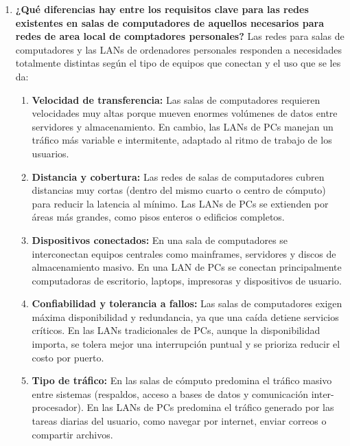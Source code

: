 \documentclass[11pt,a4paper]{article}
\begin{document}
\begin{enumerate}[label=15.\arabic*), itemsep=0.3cm]

  \item \textbf{¿Qué diferencias hay entre los requisitos clave para las redes existentes en salas de computadores de aquellos necesarios para redes de area local de comptadores personales?}
    Las redes para salas de computadores y las LANs de ordenadores personales responden a necesidades totalmente distintas según el tipo de equipos que conectan y el uso que se les da:

    \begin{enumerate}
      \item \textbf{Velocidad de transferencia:}
      Las salas de computadores requieren velocidades muy altas porque mueven enormes volúmenes de datos entre servidores y almacenamiento. En cambio, las LANs de PCs manejan un tráfico más variable e intermitente, adaptado al ritmo de trabajo de los usuarios.

      \item \textbf{Distancia y cobertura:}
      Las redes de salas de computadores cubren distancias muy cortas (dentro del mismo cuarto o centro de cómputo) para reducir la latencia al mínimo. Las LANs de PCs se extienden por áreas más grandes, como pisos enteros o edificios completos.

      \item \textbf{Dispositivos conectados:}
      En una sala de computadores se interconectan equipos centrales como mainframes, servidores y discos de almacenamiento masivo. En una LAN de PCs se conectan principalmente computadoras de escritorio, laptops, impresoras y dispositivos de usuario.

      \item \textbf{Confiabilidad y tolerancia a fallos:}
      Las salas de computadores exigen máxima disponibilidad y redundancia, ya que una caída detiene servicios críticos. En las LANs tradicionales de PCs, aunque la disponibilidad importa, se tolera mejor una interrupción puntual y se prioriza reducir el costo por puerto.

      \item \textbf{Tipo de tráfico:}
      En las salas de cómputo predomina el tráfico masivo entre sistemas (respaldos, acceso a bases de datos y comunicación inter-procesador). En las LANs de PCs predomina el tráfico generado por las tareas diarias del usuario, como navegar por internet, enviar correos o compartir archivos.
    \end{enumerate}


\end{enumerate}
\end{document}
